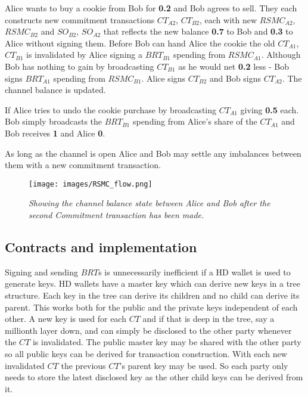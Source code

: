 Alice wants to buy a cookie from Bob for \textbf{0.2\bitcoin} and Bob agrees to sell. They each constructs new commitment transactions $CT_{A2}$, $CT_{B2}$, each with new $RSMC_{A2}$, $RSMC_{B2}$ and $SO_{B2}$, $SO_{A2}$ that reflects the new balance \textbf{0.7\bitcoin} to Bob and \textbf{0.3\bitcoin} to Alice without signing them. Before Bob can hand Alice the cookie the old $CT_{A1}$, $CT_{B1}$ is invalidated by Alice signing a $BRT_{B1}$ spending from $RSMC_{A1}$. Although Bob has nothing to gain by broadcasting $CT_{B1}$ as he would net \textbf{0.2\bitcoin} less - Bob signs $BRT_{A1}$ spending from $RSMC_{B1}$. Alice signs $CT_{B2}$ and Bob signs $CT_{A2}$. The channel balance is updated.

If Alice tries to undo the cookie purchase by broadcasting $CT_{A1}$ giving \textbf{0.5\bitcoin} each. Bob simply broadcasts the $BRT_{B1}$ spending from Alice's share of the $CT_{A1}$ and Bob receives \textbf{1\bitcoin} and Alice \textbf{0\bitcoin}. 


As long as the channel is open Alice and Bob may settle any imbalances between them with a new commitment transaction. 

\begin{figure}[!htb]
		\hspace*{-1.2cm} 
	\centering
	\texttt{[image: images/RSMC\_flow.png]}
	\caption{\textit{Showing the channel balance state between Alice and Bob after the second Commitment transaction has been made. 
	}}
	\label{fig:merkle:tree}
		\hspace*{2mm} 
\end{figure}

\subsection{Contracts and implementation}
\label{sec:hdw}
Signing and sending $BRT$s is unnecessarily inefficient if a HD wallet is used to generate keys\cite{bip:0032:hd:wallet}. HD wallets have a master key which can derive new keys in a tree structure. Each key in the tree can derive its children and no child can derive its parent. This works both for the public and the private keys independent of each other. A new key is used for each $CT$ and if that is deep in the tree, say a millionth layer down, and can simply be disclosed to the other party whenever the $CT$ is invalidated. The public master key may be shared with the other party so all public keys can be derived for transaction construction. With each new invalidated $CT$ the previous $CT$'s parent key may be used. So each party only needs to store the latest disclosed key as the other child keys can be derived from it.

